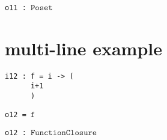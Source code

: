 \documentclass[12pt,a4paper]{amsart}
\begin{document}
\noindent\verb|o11 : |$\texttt{Poset}$
\smallskip


\section{multi-line example}
\smallskip
\begin{verbatim}
i12 : f = i -> (
      i+1
      )
\end{verbatim}
\noindent\verb|o12 = |$\texttt{f}$

\noindent\verb|o12 : |$\texttt{FunctionClosure}$
\smallskip
\end{document}
